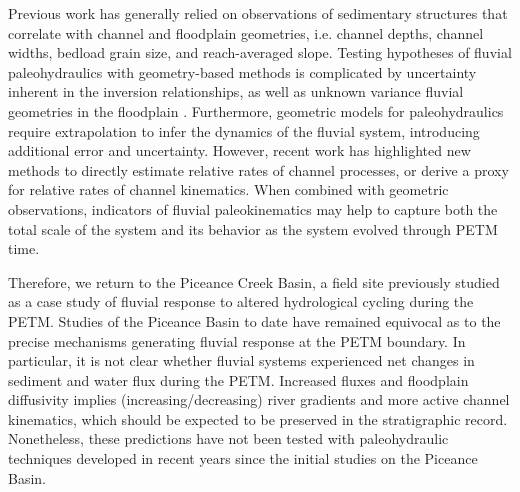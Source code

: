 \documentclass[draft]{compact_proposal}
\begin{document}
Previous work has generally relied on observations of sedimentary structures that correlate with channel and floodplain geometries, i.e. channel depths, channel widths, bedload grain size, and reach-averaged slope.
Testing hypotheses of fluvial paleohydraulics with geometry-based methods is complicated by uncertainty inherent in the inversion relationships, as well as unknown variance fluvial geometries in the floodplain .
Furthermore, geometric models for paleohydraulics require extrapolation to infer the dynamics of the fluvial system, introducing additional error and uncertainty.
However, recent work has highlighted new methods to directly estimate relative rates of channel processes, or derive a proxy for relative rates of channel kinematics.
When combined with geometric observations, indicators of fluvial paleokinematics may help to capture both the total scale of the system and its behavior as the system evolved through PETM time.



Therefore, we return to the Piceance Creek Basin, a field site previously studied as a case study of fluvial response to altered hydrological cycling during the PETM.
Studies of the Piceance Basin to date  have remained equivocal as to the precise mechanisms generating fluvial response at the PETM boundary.
In particular, it is not clear whether fluvial systems experienced net changes in sediment and water flux during the PETM.
Increased fluxes and floodplain diffusivity implies (increasing/decreasing) river gradients and more active channel kinematics, which should be expected to be preserved in the stratigraphic record.
Nonetheless, these predictions have not been tested with paleohydraulic techniques developed in recent years since the initial studies on the Piceance Basin.
\end{document}
